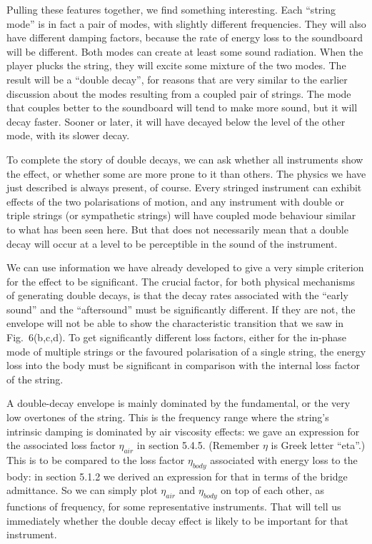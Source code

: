 
  Pulling these features together, we find something interesting. Each “string 
  mode” is in fact a pair of modes, with slightly different frequencies. They 
  will also have different damping factors, because the rate of energy loss to 
  the soundboard will be different. Both modes can create at least some sound 
  radiation. When the player plucks the string, they will excite some mixture 
  of the two modes. The result will be a “double decay”, for reasons that are 
  very similar to the earlier discussion about the modes resulting from a 
  coupled pair of strings. The mode that couples better to the soundboard will 
  tend to make more sound, but it will decay faster. Sooner or later, it will 
  have decayed below the level of the other mode, with its slower decay. 

  To complete the story of double decays, we can ask whether all instruments 
  show the effect, or whether some are more prone to it than others. The 
  physics we have just described is always present, of course. Every stringed 
  instrument can exhibit effects of the two polarisations of motion, and any 
  instrument with double or triple strings (or sympathetic strings) will have 
  coupled mode behaviour similar to what has been seen here. But that does not 
  necessarily mean that a double decay will occur at a level to be perceptible 
  in the sound of the instrument. 

  We can use information we have already developed to give a very simple 
  criterion for the effect to be significant. The crucial factor, for both 
  physical mechanisms of generating double decays, is that the decay rates 
  associated with the ``early sound'' and the ``aftersound'' must be 
  significantly different. If they are not, the envelope will not be able to 
  show the characteristic transition that we saw in Fig.\ 6(b,c,d). To get 
  significantly different loss factors, either for the in-phase mode of 
  multiple strings or the favoured polarisation of a single string, the energy 
  loss into the body must be significant in comparison with the internal loss 
  factor of the string. 

  A double-decay envelope is mainly dominated by the fundamental, or the very 
  low overtones of the string. This is the frequency range where the string’s 
  intrinsic damping is dominated by air viscosity effects: we gave an 
  expression for the associated loss factor $\eta_{air}$ in section 5.4.5. 
  (Remember $\eta$ is Greek letter ``eta''.) This is to be compared to the loss 
  factor $\eta_{body}$ associated with energy loss to the body: in section 
  5.1.2 we derived an expression for that in terms of the bridge admittance. So 
  we can simply plot $\eta_{air}$ and $\eta_{body}$ on top of each other, as 
  functions of frequency, for some representative instruments. That will tell 
  us immediately whether the double decay effect is likely to be important for 
  that instrument. 

